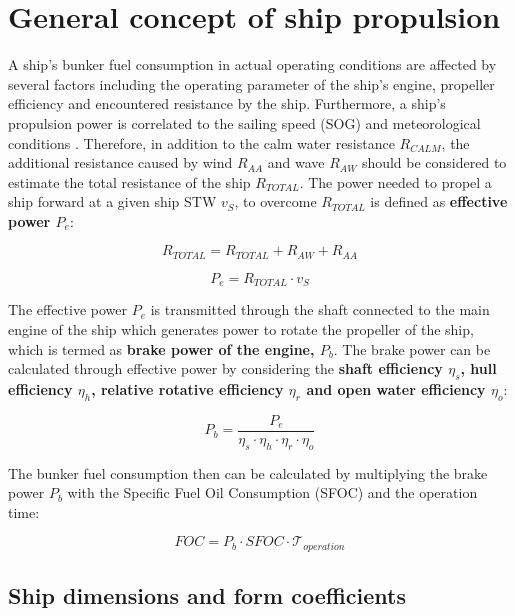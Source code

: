 \section{General concept of ship propulsion}\label{sec:power_calc}

A ship's bunker fuel consumption in actual operating conditions are affected by several factors including the operating parameter of the ship's engine, propeller efficiency and encountered resistance by the ship. Furthermore, a ship's propulsion power is correlated to the sailing speed (SOG) and meteorological conditions . Therefore, in addition to the calm water resistance $R_{CALM}$, the additional resistance caused by wind $R_{AA}$ and wave $R_{AW}$ should be considered to estimate the total resistance of the ship $R_{TOTAL}$. The power needed to propel a ship forward at a given ship STW $v_S$, to overcome $R_{TOTAL}$ is defined as \textbf{effective power $P_e$}:

\begin{equation}\label{eqn:R_tot}
    R_{TOTAL} = R_{TOTAL} + R_{AW} + R_{AA} 
\end{equation}

\begin{equation}\label{eqn:P_e}
    P_e = R_{TOTAL}\cdot v_{S}
\end{equation}

The effective power $P_e$ is transmitted through the shaft connected to the main engine of the ship which generates power to rotate the propeller of the ship, which is termed as \textbf{brake power of the engine, $P_b$}. The brake power can be calculated through effective power by considering the \textbf{shaft efficiency $\eta_s$, hull efficiency $\eta_h$, relative rotative efficiency $\eta_r$ and open water efficiency $\eta_o$}:

\begin{equation}\label{eqn:P_b}
    P_b = \frac{P_e}{\eta_s\cdot\eta_h\cdot\eta_r\cdot\eta_o}
\end{equation}

The bunker fuel consumption then can be calculated by multiplying the brake power $P_b$ with the Specific Fuel Oil Consumption (SFOC) and the operation time:

\begin{equation}\label{eqn:FOC}
    FOC = P_b\cdot SFOC\cdot \mathcal{T}_{operation} 
\end{equation}

\subsection{Ship dimensions and form coefficients}\label{sec:Ship_design_param}

